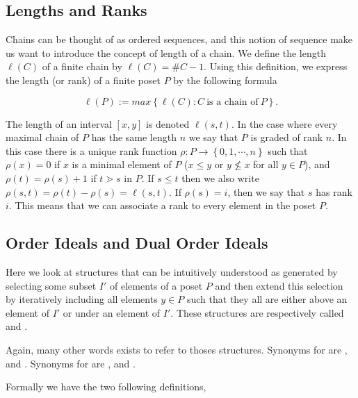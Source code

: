 \subsection{Lengths and Ranks}

Chains can be thought of as ordered sequences, and this notion of sequence make us want to introduce the concept of length of a chain. We define the length $\ell(C)$ of a finite chain by $\ell(C) = \#C - 1$. Using this definition, we express the length (or rank) of a finite poset $P$ by the following formula

$$\ell(P) := max\left\{{\ell(C) : C ~\text{is a chain of}~ P}\right\}.$$

The length of an interval $[x, y]$ is denoted $\ell(s, t)$. In the case where every maximal chain of $P$ has the same length $n$ we say that $P$ is graded of rank $n$. In this case there is a unique rank function $\rho : P \to \left\{{0, 1, \cdots , n}\right\}$ such that $\rho(x) = 0$ if $x$ is a minimal element of $P$ ($x \le y$ or $y \nleq x$ for all $y \in P$), and $\rho(t) = \rho(s) + 1$ if $t \gtrdot s$ in $P$. If $s \le t$ then we also write $\rho(s, t) = \rho(t) - \rho(s) = \ell(s, t)$. If $\rho(s) = i$, then we say that $s$ has rank $i$. This means that we can associate a rank to every element in the poset $P$.


\subsection{Order Ideals and Dual Order Ideals}

Here we look at structures that can be intuitively understood as generated by selecting some subset $I'$ of elements of a poset $P$ and then extend this selection by iteratively including all elements $y \in P$ such that they all are either above an element of $I'$ or under an element of $I'$. These structures are respectively called  and .

Again, many other words exists to refer to thoses structures. Synonyms for  are ,  and . Synonyms for  are ,  and .

Formally we have the two following definitions,


